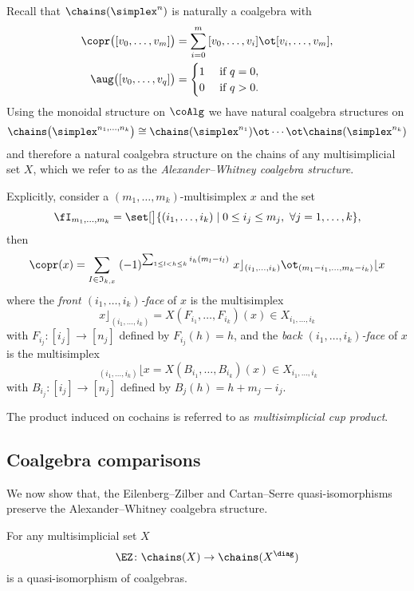 Recall that $\chains(\simplex^n)$ is naturally a coalgebra with
\[
\begin{split}
	\copr \big( [v_0, \dots, v_m] \big) &=
	\sum_{i=0}^m \, [v_0, \dots, v_i] \ot [v_i, \dots, v_m], \\
	\aug \big( [v_0, \dots, v_q] \big) &=
	\begin{cases} 1 & \text{ if } q = 0, \\ 0 & \text{ if } q>0. \end{cases}
\end{split}
\]
Using the monoidal structure on $\coAlg$ we have natural coalgebra structures on
\[
\chains \big( \simplex^{n_1, \dots, n_k} \big) \cong
\chains(\simplex^{n_1}) \ot \dotsb \ot \chains(\simplex^{n_k})
\]
and therefore a natural coalgebra structure on the chains of any multisimplicial set $X$, which we refer to as the \textit{Alexander--Whitney coalgebra structure}.

Explicitly, consider a $(m_1,\dots,m_k)$-multisimplex $x$ and the set
\[
\fI_{m_1,\dots,m_k} = \set[\big]{(i_{1},\dots,i_{k}) \mid 0 \le i_j \le m_j,\ \forall j = 1,\dots,k},
\]
then
\[
\copr(x) =
\sum_{I\in \mathfrak{I}_{k,x}} \;
(-1)^{\sum_{1 \leq l<h \leq k} i_h (m_l-i_l) } \
x \rfloor_{(i_{1},\dots,i_{k})} \ot
\!\,_{(m_{1}-i_{1}, \dots, m_{k}-i_{k})} \lfloor x
\]
where the \textit{front $(i_1,\dots,i_k)$-face} of $x$ is the multisimplex
\[
x \rfloor_{(i_{1}, \dots, i_{k})} =
X(F_{i_1}, \dots, F_{i_k})(x) \in X_{i_1,\dots,i_k}
\]
with
$F_{i_j} \colon [i_j] \to [n_j]$ defined by $F_{i_j}(h)=h$, and the \textit{back $(i_1,\dots,i_k)$-face} of $x$ is the multisimplex
\[
\,_{(i_{1}, \dots, i_{k})} \lfloor x =
X(B_{i_1}, \dots, B_{i_k})(x) \in X_{i_1,\dots,i_k}
\]
with $B_{i_j} \colon [i_j] \to [n_j]$ defined by $B_j(h) = h+m_j-i_j$.

The product induced on cochains is referred to as \textit{multisimplicial cup product}.

\subsection{Coalgebra comparisons}

We now show that, the Eilenberg--Zilber and Cartan--Serre quasi-isomorphisms preserve the Alexander--Whitney coalgebra structure.

\begin{theorem}
	For any multisimplicial set $X$
	\[
	\EZ \colon \chains(X) \to \chains(X^{\diag})
	\]
	is a quasi-isomorphism of coalgebras.
\end{theorem}

